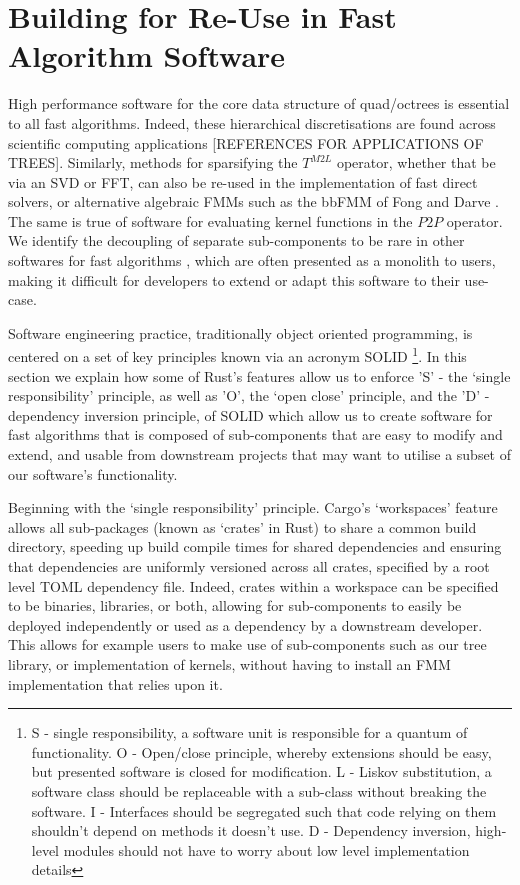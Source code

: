 \section{Building for Re-Use in Fast Algorithm Software}\label{chpt:2:sec:3}

High performance software for the core data structure of quad/octrees is essential to all fast algorithms. Indeed, these hierarchical discretisations are found across scientific computing applications [REFERENCES FOR APPLICATIONS OF TREES]. Similarly, methods for sparsifying the $T^{M2L}$ operator, whether that be via an SVD or FFT, can also be re-used in the implementation of fast direct solvers, or alternative algebraic FMMs such as the bbFMM of Fong and Darve \cite{fong2009black}. The same is true of software for evaluating kernel functions in the $P2P$ operator. We identify the decoupling of separate sub-components to be rare in other softwares for fast algorithms \cite{malhotra2015pvfmm,wang2021exafmm,h2lib2016github}, which are often presented as a monolith to users, making it difficult for developers to extend or adapt this software to their use-case.

Software engineering practice, traditionally object oriented programming, is centered on a set of key principles known via an acronym SOLID \footnote{S - single responsibility, a software unit is responsible for a quantum of functionality. O - Open/close principle, whereby extensions should be easy, but presented software is closed for modification. L - Liskov substitution, a software class should be replaceable with a sub-class without breaking the software. I - Interfaces should be segregated such that code relying on them shouldn't depend on methods it doesn't use. D - Dependency inversion, high-level modules should not have to worry about low level implementation details}. In this section we explain how some of Rust's features allow us to enforce 'S' - the `single responsibility' principle, as well as 'O', the `open close' principle, and the 'D' - dependency inversion principle, of SOLID which allow us to create software for fast algorithms that is composed of sub-components that are easy to modify and extend, and usable from downstream projects that may want to utilise a subset of our software's functionality.

Beginning with the `single responsibility' principle. Cargo's `workspaces' feature allows all sub-packages (known as `crates' in Rust) to share a common build directory, speeding up build compile times for shared dependencies and ensuring that dependencies are uniformly versioned across all crates, specified by a root level TOML dependency file. Indeed, crates within a workspace can be specified to be binaries, libraries, or both, allowing for sub-components to easily be deployed independently or used as a dependency by a downstream developer. This allows for example users to make use of sub-components such as our tree library, or implementation of kernels, without having to install an FMM implementation that relies upon it.

